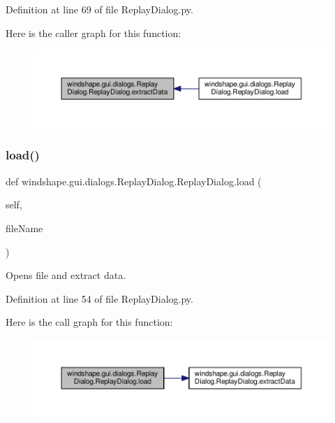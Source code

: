Definition at line 69 of file Replay\+Dialog.\+py.

Here is the caller graph for this function\+:\nopagebreak
\begin{figure}[H]
\begin{center}
\leavevmode
\includegraphics[width=350pt]{classwindshape_1_1gui_1_1dialogs_1_1_replay_dialog_1_1_replay_dialog_ad8259d3892a7652ecae975b973e73294_icgraph}
\end{center}
\end{figure}
\mbox{\label{classwindshape_1_1gui_1_1dialogs_1_1_replay_dialog_1_1_replay_dialog_ac0e3e46a05475732ed51c2da6874718e}} 
\subsubsection{\texorpdfstring{load()}{load()}}
{\footnotesize\ttfamily def windshape.\+gui.\+dialogs.\+Replay\+Dialog.\+Replay\+Dialog.\+load (\begin{DoxyParamCaption}\item[{}]{self,  }\item[{}]{file\+Name }\end{DoxyParamCaption})}

\begin{DoxyVerb}Opens file and extract data.\end{DoxyVerb}
 

Definition at line 54 of file Replay\+Dialog.\+py.

Here is the call graph for this function\+:\nopagebreak
\begin{figure}[H]
\begin{center}
\leavevmode
\includegraphics[width=350pt]{classwindshape_1_1gui_1_1dialogs_1_1_replay_dialog_1_1_replay_dialog_ac0e3e46a05475732ed51c2da6874718e_cgraph}
\end{center}
\end{figure}


